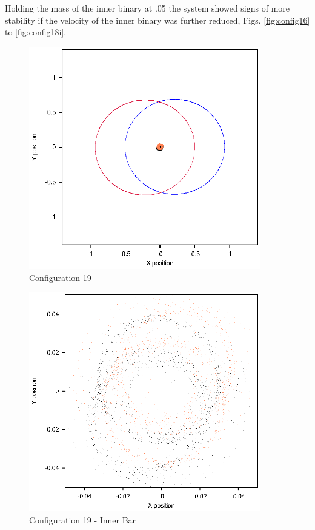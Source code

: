 \documentclass[a4paper,12pt]{article}
\begin{document}
Holding the mass of the inner binary at .05 the system showed signs of more stability if the velocity of the inner binary was further reduced, Figs. \ref{fig:config16} to \ref{fig:config18i}.

\begin{figure}[H]
\centering
\includegraphics[width=0.9\textwidth]{./2017results/06-8-06-25/Orbit.eps}
\caption{Configuration 19}
\label{fig:config19}
\end{figure}
\begin{figure}[H]
\centering
\includegraphics[width=0.9\textwidth]{./2017results/06-8-06-25/Inner.eps}
\caption{Configuration 19 - Inner Bar}
\label{fig:config19i}
\end{figure}
\end{document}
